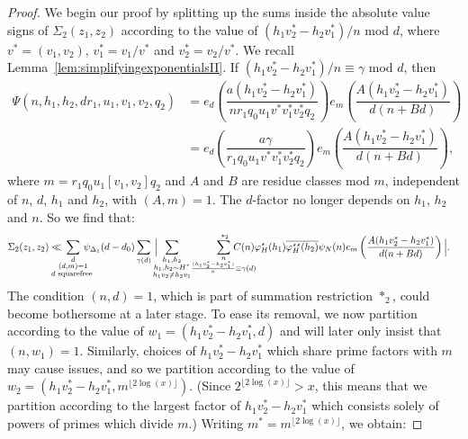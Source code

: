 \documentclass{amsart}
\numberwithin{equation}{section}
\begin{document}
\begin{proof}
\vspace{3mm}
 We begin our proof by splitting up the sums inside the absolute value signs of $\Sigma_2(z_1,z_2)$  according to the value of $(h_1v_2^*-h_2v_1^*)/n$ mod $d$, where  $v^*=(v_1,v_2)$, $v_1^* = v_1/v^*$ and $v_2^* = v_2/v^*$. We recall Lemma~\ref{lem:simplifyingexponentialsII}.
If $(h_1v_2^*-h_2v_1^*)/n \equiv \gamma$ mod $d$, then 
\begin{align*}
\Psi(n,h_1,h_2,dr_1,u_1,v_1,v_2,q_2)&=e_{d}\left(\dfrac{a(h_1v_2^*-h_2v_1^*)}{nr_1q_0u_1v^*v_1^*v_2^*q_2}\right) e_{m}\left(\dfrac{A (h_1v_2^*-h_2v_1^*) }{d(n+B d)}\right) \\ 
&=e_{d}\left(\dfrac{a\gamma}{r_1q_0u_1v^*v_1^*v_2^*q_2}\right) e_{m}\left(\dfrac{A (h_1v_2^*-h_2v_1^*) }{d(n+B d)}\right),
\end{align*}
 where  $m=  r_1q_0 u_1 [v_1,v_2]q_2$ and $A$ and $B$ are residue classes mod $m$,   independent of $n$, $d$, $h_1$ and $h_2$,  with $(A,m)=1$. 
The $d$-factor no longer depends on $h_1$, $h_2$ and $n$. So we find that: 
 \begin{align*}
\Sigma_2(z_1,z_2)&\ll\!\!\!\!\!\!\!\!
 \sum_{\substack{d  \\ (d,m)=1 \\ d \mbox{\begin{scriptsize}
squarefree
\end{scriptsize}}
}} \!\!\!\!\!\!\!\!\psi_{\Delta_1}(d-d_0)\sum_{\substack{\gamma (d) }}\, \Big|\!\!\!\! \sum_{\substack{h_1, h_2 \\ h_1, h_2 \sim H^* \\ h_1 v_2 \neq h_2v_1 }}  \!\sum_{\substack{n  \\\frac{(h_1v_2^*-h_2v_1^*)}{n} \equiv \gamma(d) }}^{\,\,*_2}\!\!\! \!\!\!\!\!\!\!\!\!\!\!\!C(n)\varphi^\star_H(h_1) \overline{\varphi^{\star\star}_H(h_2)}\psi_N(n)   e_{m}\left(\frac{A (h_1v_2^*-h_2v_1^*) }{d(n+B d)}\right) \Big|.
\end{align*}
The condition $(n,d)=1$, which is part of summation restriction $*_2$, could become bothersome at a later stage. To ease its removal, we now partition according to the value of $w_1=(h_1v_2^*-h_2v_1^*,d)$ and will later only insist that $(n,w_1)=1$. Similarly,  choices of  $h_1v_2^*-h_2v_1^*$ which share prime factors with $m$ may cause issues, and so we partition according to the value of $w_2 = (h_1v_2^*-h_2v_1^*, m^{\lfloor 2\log(x) \rfloor})$.  (Since $ 2^{\lfloor 2\log(x) \rfloor} > x$, this means that we partition according to the largest factor of $h_1v_2^*-h_2v_1^*$ which consists solely of powers of primes which divide $m$.) Writing $m^* = m^{\lfloor 2\log(x) \rfloor}$, we obtain:

\end{proof}
\end{document}

